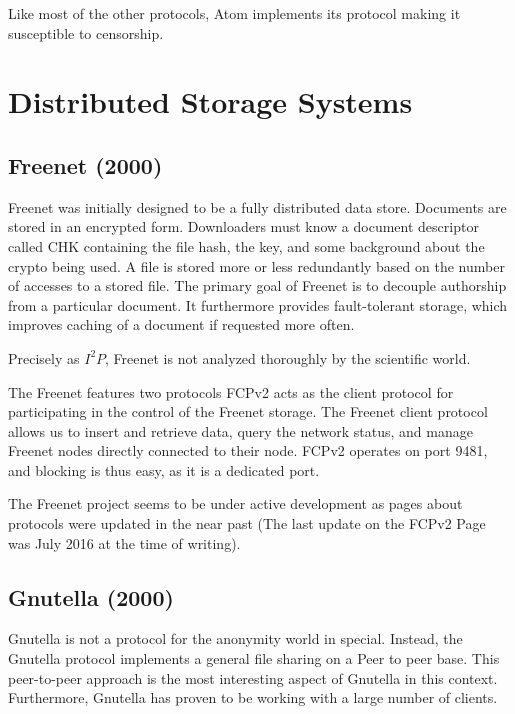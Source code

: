 Like most of the other protocols, Atom implements its protocol making it susceptible to censorship.


\section{Distributed Storage Systems}

\subsection{Freenet (2000)}
Freenet was initially designed to be a fully distributed data store\cite{freenet}. Documents are stored in an encrypted form. Downloaders must know a document descriptor called CHK containing the file hash, the key, and some background about the crypto being used. A file is stored more or less redundantly based on the number of accesses to a stored file. The primary goal of Freenet is to decouple authorship from a particular document. It furthermore provides fault-tolerant storage, which improves caching of a document if requested more often.

Precisely as $I^2P$, Freenet is not analyzed thoroughly by the scientific world. 

The Freenet features two protocols FCPv2 acts as the client protocol for participating in the control of the Freenet storage. The Freenet client protocol allows us to insert and retrieve data, query the network status, and manage Freenet nodes directly connected to their node. FCPv2 operates on port 9481, and blocking is thus easy, as it is a dedicated port. 

The Freenet project seems to be under active development as pages about protocols were updated in the near past (The last update on the FCPv2 Page was July  2016 at the time of writing).

\subsection{Gnutella (2000)}
Gnutella is not a protocol for the anonymity world in special. Instead, the Gnutella protocol implements a general file sharing on a Peer to peer base. This peer-to-peer approach is the most interesting aspect of Gnutella in this context. Furthermore, Gnutella has proven to be working with a large number of clients.

